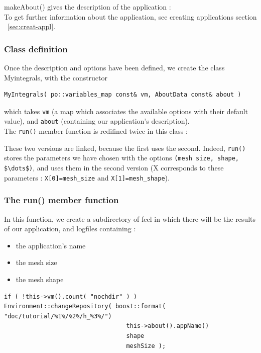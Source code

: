 

makeAbout() gives the description of the application :\\



To get further information about the application, see creating applications section ~\ref{sec:creat-appl}.

\subsubsection{Class definition}

Once the description and options have been defined, we create the class Myintegrals, with the constructor \\
\begin{lstlisting}
MyIntegrals( po::variables_map const& vm, AboutData const& about )
\end{lstlisting}
which takes \lstinline!vm! (a map which associates the available options with their default value), and \lstinline!about! (containing our application's description). \\

The \lstinline!run()! member function is redifined twice in this class :

These two versions are linked, because the first uses the second. Indeed, \lstinline!run()! stores the parameters we have chosen with the options \lstinline!(mesh size, shape, $\dots$)!, and uses them in the second version (X corresponds to these parameters : \lstinline!X[0]=mesh_size! and \lstinline!X[1]=mesh_shape!). \\

\subsubsection{The run() member function}
In this function, we create a subdirectory of feel in which there will be the results of our application, and logfiles containing :
\begin{itemize}
\item the application's name
\item the mesh size
\item the mesh shape
\end{itemize}

\begin{lstlisting}
if ( !this->vm().count( "nochdir" ) )
Environment::changeRepository( boost::format( "doc/tutorial/%1%/%2%/h_%3%/")
                                  this->about().appName()
                                  shape
                                  meshSize );

\end{lstlisting}

